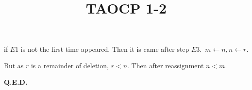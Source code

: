 \documentclass{article}
\title{TAOCP 1\mbox{-}2}
\begin{document}
\maketitle

if \( E1 \) is not the first time appeared. Then it is came after step \( E3 \).\ \( m \leftarrow n, n \leftarrow r \).

But as \( r \) is a remainder of deletion, \( r < n \). Then after reassignment \( n < m \).

\textbf{Q.E.D.}
\end{document}

